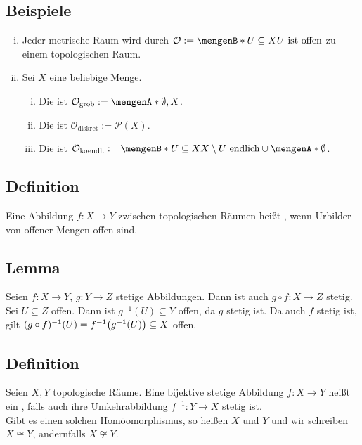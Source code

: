 \subsection[Beispiele für Topologien]{Beispiele} %
\label{sub:19}
\begin{enumerate}[(i)]
	\item Jeder metrische Raum wird durch 
	\(
		\mathcal{O} := \set[U \subseteq X]{U \text{ ist offen}} 
	\)
	zu einem topologischen Raum.
	\item Sei $X$ eine beliebige Menge.
	\begin{enumerate}[(i)]
		\item Die  ist $\mathcal{O}_{\text{grob}} := \set{\emptyset, X}$.
		\item Die  ist $\mathcal{O}_{\text{diskret}} := \mathcal{P}(X)$.
		\item Die   ist 
		$\mathcal{O}_{\text{koendl.}} := \set[U \subseteq X]{X \setminus U \text{ endlich}} \cup \set{\emptyset}$.
	\end{enumerate}
\end{enumerate}

\subsection[Definition: Stetigkeit in topologischen Räumen]{Definition} %
\label{sub:110}
Eine Abbildung $f :X \to Y$ zwischen topologischen Räumen heißt , wenn Urbilder von offener Mengen offen sind.

\subsection[Lemma: Die Kompositionen stetiger Abbildungen sind stetig]{Lemma} %
\label{sub:111}
Seien $f : X \to Y$, $g : Y \to Z$ stetige Abbildungen. Dann ist auch $g \circ f : X \to Z$ stetig.
Sei $U \subseteq Z$ offen. Dann ist $g ^{-1}(U) \subseteq Y$ offen, da $g$ stetig ist. Da auch $f$ stetig ist, gilt 
$\enbrace{g \circ f } ^{-1} (U) = f ^{-1} \enbrace[\big]{g ^{-1} (U)} \subseteq  X$ offen. \bewende

\subsection[Definition: Homöomorphismus]{Definition} %
\label{sub:112}
Seien $X,Y$ topologische Räume. Eine bijektive stetige Abbildung $f : X \to Y$ heißt ein , falls auch ihre Umkehrabbildung  $f ^{-1} : Y \to X$ 
stetig ist. \\
Gibt es einen solchen Homöomorphismus, so heißen $X$ und $Y$  und wir schreiben $X \cong Y$, andernfalls $X \not\cong Y$.

